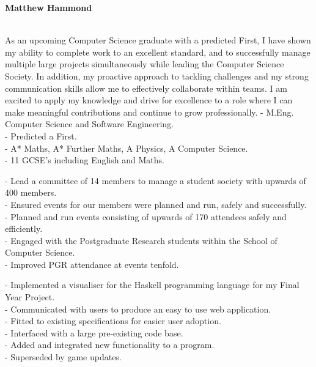 \documentclass[twoside]{article}
\begin{document}
\selectfont
\begin{center}
    \noindent\huge\textbf{Matthew Hammond}
\end{center}\hr
{}
\hfill
{}\\
\hfill
{}\hr
As an upcoming Computer Science graduate with a predicted First, I have shown my ability to complete work to an excellent standard, and to successfully manage multiple large projects simultaneously while leading the Computer Science Society. In addition, my proactive approach to tackling challenges and my strong communication skills allow me to effectively collaborate within teams. I am excited to apply my knowledge and drive for excellence to a role where I can make meaningful contributions and continue to grow professionally.
- M.Eng. Computer Science and Software Engineering.\\
- Predicted a First.\vspace{2pt}\\
- A* Maths, A* Further Maths, A Physics, A Computer Science.\vspace{2pt}\\
- 11 GCSE's including English and Maths.

- Lead a committee of 14 members to manage a student society with upwards of 400 members.\\
- Ensured events for our members were planned and run, safely and successfully.\\
- Planned and run events consisting of upwards of 170 attendees safely and efficiently.\\
- Engaged with the Postgraduate Research students within the School of Computer Science.\\
- Improved PGR attendance at events tenfold.

- Implemented a visualiser for the Haskell programming language for my Final Year Project.\\
- Communicated with users to produce an easy to use web application.\\
- Fitted to existing specifications for easier user adoption.\\
- Interfaced with a large pre-existing code base.\\
- Added and integrated new functionality to a program.\\
- Superseded by game updates.
\end{document}
